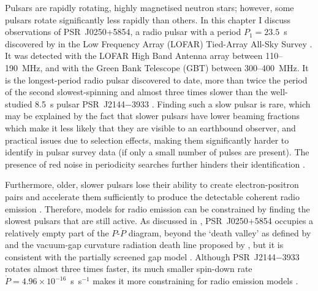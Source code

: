 Pulsars are rapidly rotating, highly magnetised neutron stars; however, some pulsars rotate significantly less rapidly than others. In this chapter I discuss observations of PSR~J0250+5854, a radio pulsar with a period $P_1=23.5$~s discovered by \citet{TBC+2018} in the Low Frequency Array (LOFAR) Tied-Array All-Sky Survey \citep[LOTAAS;][]{SCB+2019}. It was detected with the LOFAR High Band Antenna array between 110--190~MHz, and with the Green Bank Telescope (GBT) between 300--400~MHz. It is the longest-period radio pulsar discovered to date, more than twice the period of the second slowest-spinning \citep[PSR~J2251$-$3711 at $P_1 = 12.1$~s;][]{MKE+2020} and almost three times slower than the well-studied 8.5~s pulsar PSR~J2144$-$3933 \citep{YMJx1999}. %
Finding such a slow pulsar is rare, which may be explained by the fact that slower pulsars have lower beaming fractions which make it less likely that they are visible to an earthbound observer, and practical issues due to selection effects, making them significantly harder to identify in pulsar survey data (if only a small number of pulses are present). The presence of red noise in periodicity searches further hinders their identification \citep[e.g.][]{LBH+2015,HKRx2017}.


Furthermore, older, slower pulsars lose their ability to create electron-positron pairs and accelerate them sufficiently to produce the detectable coherent radio emission \citep{Sxxx1971}. Therefore, models for radio emission can be constrained by finding the slowest pulsars that are still active. As discussed in \citet{TBC+2018}, PSR~J0250+5854 occupies a relatively empty part of the $P$-$\dot{P}$ diagram, beyond the `death valley' as defined by \citet{CRxx1993} and the vacuum-gap curvature radiation death line proposed by \citet{ZHMx2000}, but it is consistent with the partially screened gap model \citep[e.g.][]{Sxxx2013}. Although PSR~J2144$-$3933 rotates almost three times faster, its much smaller spin-down rate $\dot{P} = 4.96\times10^{-16}$~s~s$^{-1}$ makes it more constraining for radio emission models \citep{MBMA2020}.


